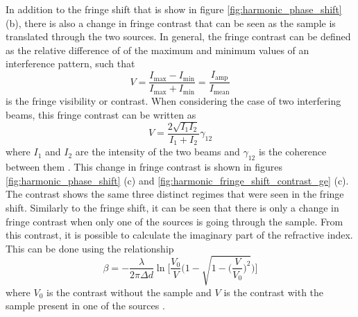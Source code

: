 In addition to the fringe shift that is show in figure \ref{fig:harmonic_phase_shift} (b), there is also a change in fringe contrast that can be seen as the sample is translated through the two sources.  In general, the fringe contrast can be defined as the relative difference of of the maximum and minimum values of an interference pattern, such that
\begin{equation}
	V=\frac{I_{\mathrm{max}} - I_{\mathrm{min}}}{I_{\mathrm{max}} + I_{\mathrm{min}}} = \frac{I_{\mathrm{amp}}}{I_{\mathrm{mean}}}
\end{equation}
is the fringe visibility or contrast.  When considering the case of two interfering beams, this fringe contrast can be written as
\begin{equation}
\label{eqn:fringe_visibility} 
	V = \frac{2\sqrt{I_1 I_2}}{I_1 + I_2}\gamma_{12}
\end{equation}
where $I_1$ and $I_2$ are the intensity of the two beams and $\gamma_{12}$ is the coherence between them \cite{hemmersMulticolorXUVInterferometry2009, ditmireSpatialCoherenceMeasurement1996, wilsonDoubleSlitInterferometry2012}. 
This change in fringe contrast is shown in figures \ref{fig:harmonic_phase_shift} (c) and \ref{fig:harmonic_fringe_shift_contrast_ge} (c).  The contrast shows the same three distinct regimes that were seen in the fringe shift.  Similarly to the fringe shift, it can be seen that there is only a change in fringe contrast when only one of the sources is going through the sample.  From this contrast, it is possible to calculate the imaginary part of the refractive index.  This can be done using the relationship
\begin{equation}
\label{eqn:beta_fringe_contrast}
	\beta = -\frac{\lambda}{2\pi \Delta d} \ln\Bigg[\frac{V_0}{V}\Bigg(1-\sqrt{1-\bigg(\frac{V}{V_0}\bigg)^2}\Bigg)\Bigg]
\end{equation} 
where $V_0$ is the contrast without the sample and $V$ is the contrast with the sample present in one of the sources \cite{hemmersMulticolorXUVInterferometry2009}.



